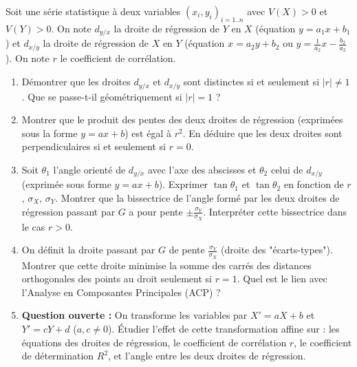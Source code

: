 \documentclass[11pt]{article}
\begin{document}
\begin{exercice}
Soit une série statistique à deux variables $(x_i, y_i)_{i=1..n}$ avec $V(X) > 0$ et $V(Y) > 0$. On note $d_{y/x}$ la droite de régression de $Y$ en $X$ (équation $y = a_1 x + b_1$) et $d_{x/y}$ la droite de régression de $X$ en $Y$ (équation $x = a_2 y + b_2$ ou $y = \frac{1}{a_2}x - \frac{b_2}{a_2}$). On note $r$ le coefficient de corrélation.
\begin{enumerate}
    \item Démontrer que les droites $d_{y/x}$ et $d_{x/y}$ sont distinctes si et seulement si $|r| \neq 1$. Que se passe-t-il géométriquement si $|r| = 1$ ?
    \item Montrer que le produit des pentes des deux droites de régression (exprimées sous la forme $y = ax+b$) est égal à $r^2$. En déduire que les deux droites sont perpendiculaires si et seulement si $r=0$.
    \item Soit $\theta_1$ l'angle orienté de $d_{y/x}$ avec l'axe des abscisses et $\theta_2$ celui de $d_{x/y}$ (exprimée sous forme $y=ax+b$). Exprimer $\tan\theta_1$ et $\tan\theta_2$ en fonction de $r$, $\sigma_X$, $\sigma_Y$. Montrer que la bissectrice de l'angle formé par les deux droites de régression passant par $G$ a pour pente $\pm \frac{\sigma_Y}{\sigma_X}$. Interpréter cette bissectrice dans le cas $r>0$.
    \item On définit la droite passant par $G$ de pente $\frac{\sigma_Y}{\sigma_X}$ (droite des "écarts-types"). Montrer que cette droite minimise la somme des carrés des distances orthogonales des points au droit seulement si $r=1$. Quel est le lien avec l'Analyse en Composantes Principales (ACP) ?
    \item \textbf{Question ouverte :} On transforme les variables par $X' = aX + b$ et $Y' = cY + d$ ($a,c \neq 0$). Étudier l'effet de cette transformation affine sur : les équations des droites de régression, le coefficient de corrélation $r$, le coefficient de détermination $R^2$, et l'angle entre les deux droites de régression.
\end{enumerate}
\end{exercice}
\end{document}
